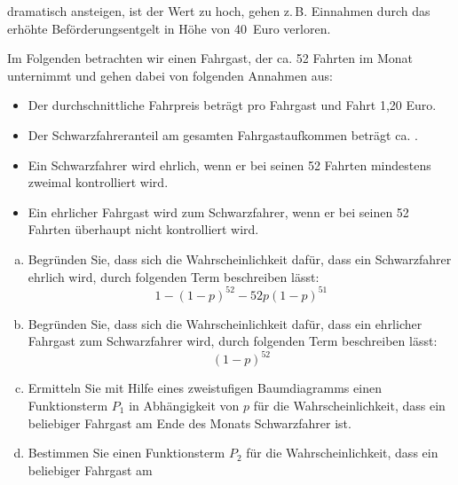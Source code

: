 \begin{exercise}
\begin{enumerate}[1)]
            dramatisch ansteigen, ist der Wert zu hoch, gehen z.\,B. Einnahmen
            durch das \glqq erhöhte Beförderungsentgelt\grqq{} in Höhe von
            40~Euro verloren.\par
            Im Folgenden betrachten wir einen Fahrgast, der ca. 52 Fahrten
            im Monat unternimmt und gehen dabei von folgenden Annahmen aus:
            \begin{itemize}
              \item Der durchschnittliche Fahrpreis beträgt pro Fahrgast
                    und Fahrt 1,20 Euro.
              \item Der Schwarzfahreranteil am gesamten Fahrgastaufkommen
                    beträgt ca. .
              \item Ein Schwarzfahrer wird ehrlich, wenn er bei seinen 52
                    Fahrten mindestens zweimal kontrolliert wird.
              \item Ein ehrlicher Fahrgast wird zum Schwarzfahrer, wenn er
                    bei seinen 52 Fahrten überhaupt nicht kontrolliert wird.
            \end{itemize}
            \begin{enumerate}[a)]
              \item Begründen Sie, dass sich die Wahrscheinlichkeit dafür,
                    dass ein Schwarzfahrer ehrlich wird, durch folgenden
                    Term beschreiben lässt:
                    \begin{equation*}
                      1-(1-p)^{52}-52p(1-p)^{51}
                    \end{equation*}
              \item Begründen Sie, dass sich die Wahrscheinlichkeit dafür,
                    dass ein ehrlicher Fahrgast zum Schwarzfahrer wird, durch
                    folgenden Term beschreiben lässt:
                    \begin{equation*}
                      (1-p)^{52}
                    \end{equation*}
              \item Ermitteln Sie mit Hilfe eines zweistufigen Baumdiagramms
                    einen Funktionsterm $P_{1}$ in Abhängigkeit von $p$ für
                    die Wahrscheinlichkeit, dass ein beliebiger Fahrgast
                    am Ende des Monats Schwarzfahrer ist.
              \item Bestimmen Sie einen Funktionsterm $P_{2}$ für die
                    Wahrscheinlichkeit, dass ein beliebiger Fahrgast am

\end{enumerate}
\end{enumerate}
\end{exercise}

